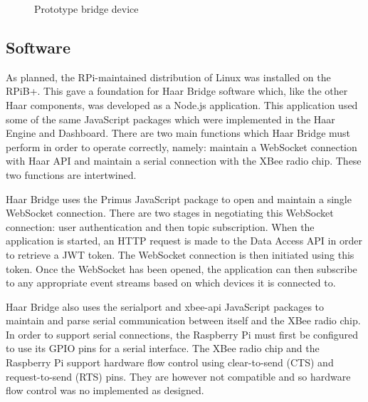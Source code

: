       \begin{figure}
        \centering
        \caption{Prototype bridge device}\label{figure:bridge-device}
      \end{figure}

    \subsection{Software}
      As planned, the RPi-maintained distribution of Linux was installed on the RPiB+. This gave a foundation for Haar Bridge software which, like the other Haar components, was developed as a Node.js application. This application used some of the same JavaScript packages which were implemented in the Haar Engine and Dashboard. There are two main functions which Haar Bridge must perform in order to operate correctly, namely: maintain a WebSocket connection with Haar API and maintain a serial connection with the XBee radio chip. These two functions are intertwined.

      Haar Bridge uses the Primus JavaScript package to open and maintain a single WebSocket connection. There are two stages in negotiating this WebSocket connection: user authentication and then topic subscription. When the application is started, an HTTP request is made to the Data Access API in order to retrieve a JWT token. The WebSocket connection is then initiated using this token. Once the WebSocket has been opened, the application can then subscribe to any appropriate event streams based on which devices it is connected to.

      Haar Bridge also uses the serialport and xbee-api JavaScript packages to maintain and parse serial communication between itself and the XBee radio chip. In order to support serial connections, the Raspberry Pi must first be configured to use its GPIO pins for a serial interface. The XBee radio chip and the Raspberry Pi support hardware flow control using clear-to-send (CTS) and request-to-send (RTS) pins. They are however not compatible and so hardware flow control was no implemented as designed.

